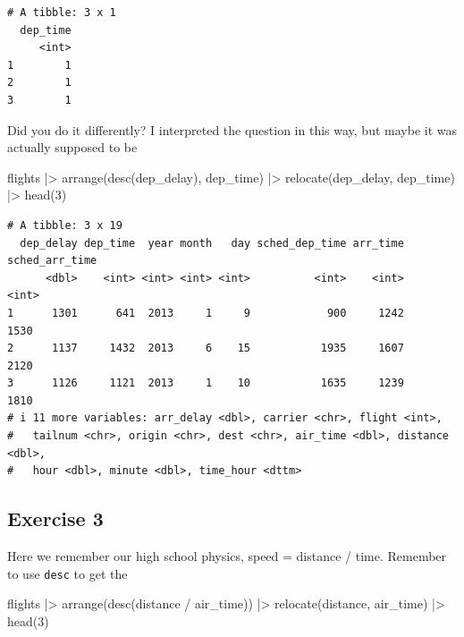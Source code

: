 \documentclass[
  letterpaper,
  DIV=11,
  numbers=noendperiod]{scrreprt}
\newenvironment{Shaded}{\begin{snugshade}}{\end{snugshade}}
\newcommand{\DecValTok}[1]{\textcolor[rgb]{0.68,0.00,0.00}{#1}}
\newcommand{\FunctionTok}[1]{\textcolor[rgb]{0.28,0.35,0.67}{#1}}
\newcommand{\NormalTok}[1]{\textcolor[rgb]{0.00,0.23,0.31}{#1}}
\newcommand{\SpecialCharTok}[1]{\textcolor[rgb]{0.37,0.37,0.37}{#1}}
\begin{document}
\begin{verbatim}
# A tibble: 3 x 1
  dep_time
     <int>
1        1
2        1
3        1
\end{verbatim}

Did you do it differently? I interpreted the question in this way, but
maybe it was actually supposed to be

\begin{Shaded}
\begin{Highlighting}[]
\NormalTok{flights }\SpecialCharTok{|\textgreater{}}
  \FunctionTok{arrange}\NormalTok{(}\FunctionTok{desc}\NormalTok{(dep\_delay), dep\_time) }\SpecialCharTok{|\textgreater{}}
  \FunctionTok{relocate}\NormalTok{(dep\_delay, dep\_time) }\SpecialCharTok{|\textgreater{}}
  \FunctionTok{head}\NormalTok{(}\DecValTok{3}\NormalTok{)}
\end{Highlighting}
\end{Shaded}

\begin{verbatim}
# A tibble: 3 x 19
  dep_delay dep_time  year month   day sched_dep_time arr_time sched_arr_time
      <dbl>    <int> <int> <int> <int>          <int>    <int>          <int>
1      1301      641  2013     1     9            900     1242           1530
2      1137     1432  2013     6    15           1935     1607           2120
3      1126     1121  2013     1    10           1635     1239           1810
# i 11 more variables: arr_delay <dbl>, carrier <chr>, flight <int>,
#   tailnum <chr>, origin <chr>, dest <chr>, air_time <dbl>, distance <dbl>,
#   hour <dbl>, minute <dbl>, time_hour <dttm>
\end{verbatim}

\subsection{Exercise 3}\label{exercise-3-6}

Here we remember our high school physics, speed = distance / time.
Remember to use \texttt{desc} to get the

\begin{Shaded}
\begin{Highlighting}[]
\NormalTok{flights }\SpecialCharTok{|\textgreater{}}
  \FunctionTok{arrange}\NormalTok{(}\FunctionTok{desc}\NormalTok{(distance }\SpecialCharTok{/}\NormalTok{ air\_time)) }\SpecialCharTok{|\textgreater{}}
  \FunctionTok{relocate}\NormalTok{(distance, air\_time) }\SpecialCharTok{|\textgreater{}}
  \FunctionTok{head}\NormalTok{(}\DecValTok{3}\NormalTok{)}
\end{Highlighting}
\end{Shaded}
\end{document}
